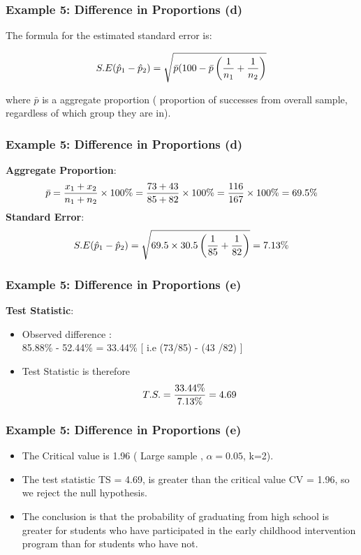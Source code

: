 \begin{frame}
\frametitle{Example 5: Difference in Proportions (d)}
The formula for the estimated standard error is:

\[ S.E (\hat{p}_1 - \hat{p}_2)  = \sqrt{\bar{p}(100- \bar{p} \left( {1 \over n_1} + {1 \over n_2}  \right)} \]


where $\bar{p}$ is a aggregate proportion ( proportion of successes from overall sample, regardless of which group they are in).
\end{frame}



\begin{frame}
\frametitle{Example 5: Difference in Proportions (d)}
\textbf{Aggregate Proportion}:\\
\[ \bar{p}  = {x_1  + x_2 \over n_1 + n_2} \times 100\% = {73+43 \over 85 + 82} \times 100\% = { 116 \over 167}\times 100\% = 69.5\% \]
\textbf{Standard Error}:\\
\[ S.E (\hat{p}_1 - \hat{p}_2)  =  \sqrt{69.5 \times 30.5 \left( {1 \over 85} + {1 \over 82}  \right)}  = 7.13\% \]
\end{frame}



\begin{frame}
\frametitle{Example 5: Difference in Proportions (e)}
\textbf{Test Statistic}:
\begin{itemize} \item Observed difference :\\
85.88\% - 52.44\%  = 33.44\% [ i.e (73/85) - (43 /82) ]
\item Test Statistic is therefore \[T.S. = {33.44\% \over 7.13\%} = 4.69\]
\end{itemize}

\end{frame}
\begin{frame}
\frametitle{Example 5: Difference in Proportions (e)}
\begin{itemize}
\item The Critical value is 1.96 ( Large sample , $\alpha = 0.05$, k=2).

\item The test statistic TS = 4.69, is greater than the critical value CV = 1.96, so we reject the null hypothesis.
\item The conclusion is that the probability of graduating from high school is greater for students who have participated in the early childhood intervention program than for students who have not.
\end{itemize}

\end{frame}




